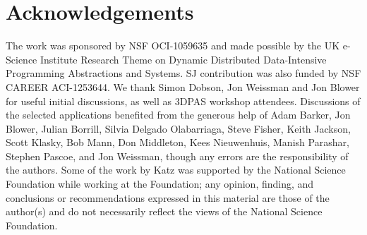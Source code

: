 






\section*{Acknowledgements}
The work was sponsored by NSF OCI-1059635 and made possible by the UK
e-Science Institute Research Theme on Dynamic Distributed Data-Intensive
Programming Abstractions and Systems.  SJ contribution was also funded by NSF
CAREER ACI-1253644.  We thank Simon Dobson, Jon Weissman and Jon Blower for
useful initial discussions, as well as 3DPAS workshop attendees. Discussions of
the selected applications benefited from the generous help of Adam Barker, Jon
Blower, Julian Borrill, Silvia Delgado Olabarriaga, Steve Fisher, Keith Jackson,
Scott Klasky, Bob Mann, Don Middleton, Kees Nieuwenhuis, Manish Parashar,
Stephen Pascoe, and Jon Weissman, though any errors are the responsibility of
the authors.  Some of the work by Katz was supported by the National Science
Foundation while working at the Foundation; any opinion, finding, and
conclusions or recommendations expressed in this material are those of the
author(s) and do not necessarily reflect the views of the National Science
Foundation.

